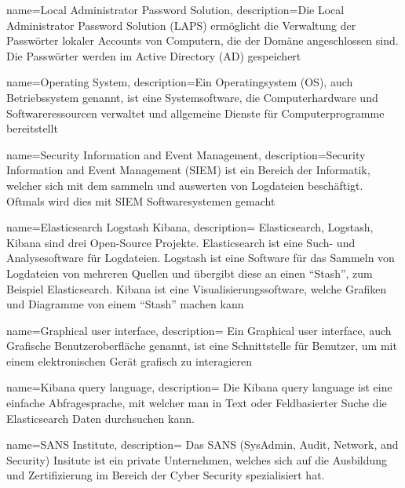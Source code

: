 {
    name=Local Administrator Password Solution,
    description={Die Local Administrator Password Solution (LAPS) ermöglicht die Verwaltung der Passwörter lokaler Accounts von Computern, die der Domäne angeschlossen sind. Die Passwörter werden im Active Directory (AD) gespeichert}
}

{
    name=Operating System,
    description={Ein Operatingsystem (OS), auch Betriebssystem genannt, ist eine Systemsoftware, die Computerhardware und Softwareressourcen verwaltet und allgemeine Dienste für Computerprogramme bereitstellt}
}

{
    name=Security Information and Event Management,
    description={Security Information and Event Management (SIEM) ist ein Bereich der Informatik, welcher sich mit dem sammeln und auswerten von Logdateien beschäftigt.
    Oftmals wird dies mit SIEM Softwaresystemen gemacht}
}

{
    name=Elasticsearch Logstash Kibana,
    description={
        Elasticsearch, Logstash, Kibana sind drei Open-Source Projekte. Elasticsearch ist eine Such- und Analysesoftware für Logdateien.
        Logstash ist eine Software für das Sammeln von Logdateien von mehreren Quellen und übergibt diese an einen ``Stash'', zum Beispiel Elasticsearch.
        Kibana ist eine Visualisierungssoftware, welche Grafiken und Diagramme von einem ``Stash'' machen kann
    }
}

{
    name=Graphical user interface,
    description={
        Ein Graphical user interface, auch Grafische Benutzeroberfläche genannt, ist eine Schnittstelle für Benutzer, um mit einem elektronischen Gerät grafisch zu interagieren
    }
}

{
    name=Kibana query language,
    description={
        Die Kibana query language ist eine einfache Abfragesprache, mit welcher man in Text oder Feldbasierter Suche die Elasticsearch Daten durchsuchen kann. 
    }
}

{
    name=SANS Institute,
    description={
        Das SANS (SysAdmin, Audit, Network, and Security) Insitute ist ein private Unternehmen, welches sich auf die Ausbildung und Zertifizierung im Bereich der Cyber Security spezialisiert hat. 
    }
}
